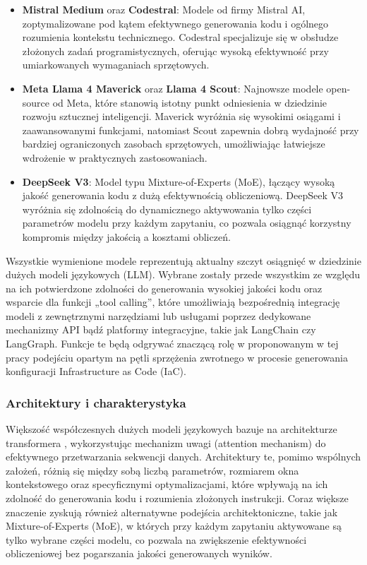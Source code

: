 \begin{itemize}
	\item \textbf{Mistral Medium} oraz \textbf{Codestral}: Modele od firmy Mistral AI, zoptymalizowane pod kątem efektywnego generowania kodu i ogólnego rozumienia kontekstu technicznego. Codestral specjalizuje się w obsłudze złożonych zadań programistycznych, oferując wysoką efektywność przy umiarkowanych wymaganiach sprzętowych.
	\item \textbf{Meta Llama 4 Maverick} oraz \textbf{Llama 4 Scout}: Najnowsze modele open-source od Meta, które stanowią istotny punkt odniesienia w dziedzinie rozwoju sztucznej inteligencji. Maverick wyróżnia się wysokimi osiągami i zaawansowanymi funkcjami, natomiast Scout zapewnia dobrą wydajność przy bardziej ograniczonych zasobach sprzętowych, umożliwiając łatwiejsze wdrożenie w praktycznych zastosowaniach.
	\item \textbf{DeepSeek V3}: Model typu Mixture-of-Experts (MoE), łączący wysoką jakość generowania kodu z dużą efektywnością obliczeniową. DeepSeek V3 wyróżnia się zdolnością do dynamicznego aktywowania tylko części parametrów modelu przy każdym zapytaniu, co pozwala osiągnąć korzystny kompromis między jakością a kosztami obliczeń.
\end{itemize}

Wszystkie wymienione modele reprezentują aktualny szczyt osiągnięć w dziedzinie dużych modeli językowych (LLM). Wybrane zostały przede wszystkim ze względu na ich potwierdzone zdolności do generowania wysokiej jakości kodu oraz wsparcie dla funkcji „tool calling”, które umożliwiają bezpośrednią integrację modeli z zewnętrznymi narzędziami lub usługami poprzez dedykowane mechanizmy API bądź platformy integracyjne, takie jak LangChain czy LangGraph. Funkcje te będą odgrywać znaczącą rolę w proponowanym w tej pracy podejściu opartym na pętli sprzężenia zwrotnego w procesie generowania konfiguracji Infrastructure as Code (IaC).

\subsubsection{Architektury i charakterystyka}

Większość współczesnych dużych modeli językowych bazuje na architekturze transformera \cite{vaswani_attention_2023}, wykorzystując mechanizm uwagi (attention mechanism) do efektywnego przetwarzania sekwencji danych. Architektury te, pomimo wspólnych założeń, różnią się między sobą liczbą parametrów, rozmiarem okna kontekstowego oraz specyficznymi optymalizacjami, które wpływają na ich zdolność do generowania kodu i rozumienia złożonych instrukcji. Coraz większe znaczenie zyskują również alternatywne podejścia architektoniczne, takie jak Mixture-of-Experts (MoE), w których przy każdym zapytaniu aktywowane są tylko wybrane części modelu, co pozwala na zwiększenie efektywności obliczeniowej bez pogarszania jakości generowanych wyników.

